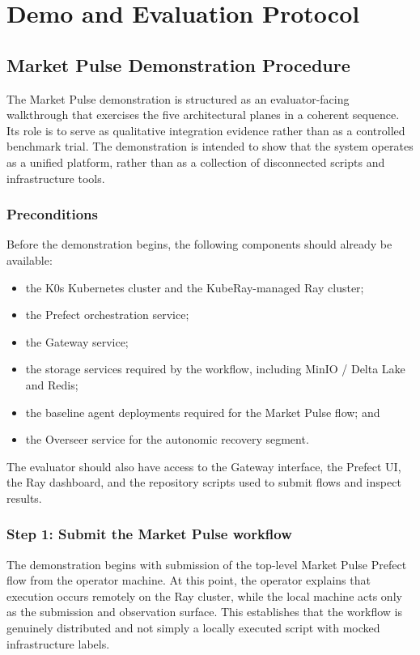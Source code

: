 \documentclass[12pt, a4paper]{report}
\begin{document}
\chapter{Demo and Evaluation Protocol}
\label{app:demo_protocol}

\section{Market Pulse Demonstration Procedure}
\label{app:demo_steps}

The Market Pulse demonstration is structured as an evaluator-facing walkthrough that
exercises the five architectural planes in a coherent sequence. Its role is to serve
as qualitative integration evidence rather than as a controlled benchmark trial. The
demonstration is intended to show that the system operates as a unified platform,
rather than as a collection of disconnected scripts and infrastructure tools.

\subsection*{Preconditions}
Before the demonstration begins, the following components should already be available:

\begin{itemize}
  \item the K0s Kubernetes cluster and the KubeRay-managed Ray cluster;
  \item the Prefect orchestration service;
  \item the Gateway service;
  \item the storage services required by the workflow, including MinIO / Delta Lake and Redis;
  \item the baseline agent deployments required for the Market Pulse flow; and
  \item the Overseer service for the autonomic recovery segment.
\end{itemize}

The evaluator should also have access to the Gateway interface, the Prefect UI, the
Ray dashboard, and the repository scripts used to submit flows and inspect results.

\subsection*{Step 1: Submit the Market Pulse workflow}
The demonstration begins with submission of the top-level Market Pulse Prefect flow
from the operator machine. At this point, the operator explains that execution occurs
remotely on the Ray cluster, while the local machine acts only as the submission and
observation surface. This establishes that the workflow is genuinely distributed and
not simply a locally executed script with mocked infrastructure labels.
\end{document}
